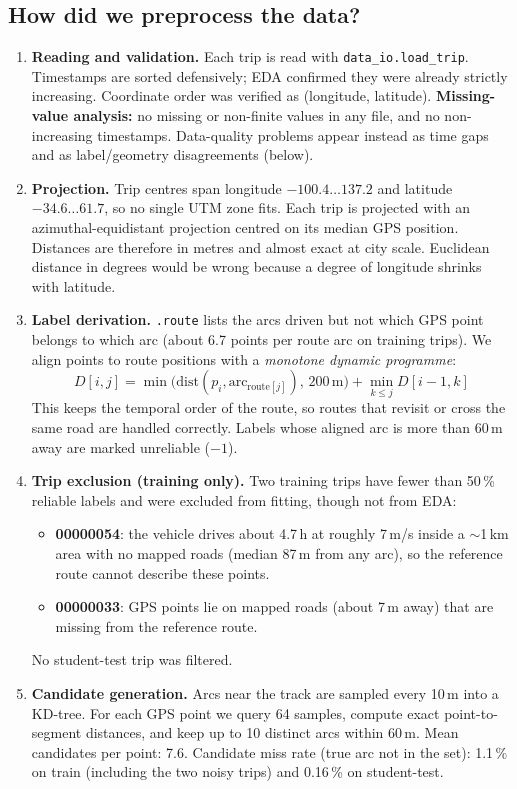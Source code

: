 \documentclass[10pt,a4paper]{article}
\newcommand{\code}[1]{\texttt{\small #1}}
\begin{document}
\subsection{How did we preprocess the data?}
\begin{enumerate}
  \item \textbf{Reading and validation.} Each trip is read with \code{data\_io.load\_trip}. Timestamps are sorted defensively; EDA confirmed they were already strictly increasing. Coordinate order was verified as (longitude, latitude). \textbf{Missing-value analysis:} no missing or non-finite values in any file, and no non-increasing timestamps. Data-quality problems appear instead as time gaps and as label/geometry disagreements (below).
  \item \textbf{Projection.} Trip centres span longitude $-100.4\ldots137.2$ and latitude $-34.6\ldots61.7$, so no single UTM zone fits. Each trip is projected with an azimuthal-equidistant projection centred on its median GPS position. Distances are therefore in metres and almost exact at city scale. Euclidean distance in degrees would be wrong because a degree of longitude shrinks with latitude.
  \item \textbf{Label derivation.} \code{.route} lists the arcs driven but not which GPS point belongs to which arc (about 6.7 points per route arc on training trips). We align points to route positions with a \emph{monotone dynamic programme}:
  \begin{equation*}
  D[i,j] = \min\bigl(\mathrm{dist}(p_i, \mathrm{arc}_{\mathrm{route}[j]}),\,200\,\mathrm{m}\bigr) + \min_{k\le j} D[i-1,k]
  \end{equation*}
  This keeps the temporal order of the route, so routes that revisit or cross the same road are handled correctly. Labels whose aligned arc is more than 60\,m away are marked unreliable ($-1$).
  \item \textbf{Trip exclusion (training only).} Two training trips have fewer than 50\,\% reliable labels and were excluded from fitting, though not from EDA:
  \begin{itemize}
    \item \textbf{00000054}: the vehicle drives about 4.7\,h at roughly 7\,m/s inside a $\sim$1\,km area with no mapped roads (median 87\,m from any arc), so the reference route cannot describe these points.
    \item \textbf{00000033}: GPS points lie on mapped roads (about 7\,m away) that are missing from the reference route.
  \end{itemize}
  No student-test trip was filtered.
  \item \textbf{Candidate generation.} Arcs near the track are sampled every 10\,m into a KD-tree. For each GPS point we query 64 samples, compute exact point-to-segment distances, and keep up to 10 distinct arcs within 60\,m. Mean candidates per point: 7.6. Candidate miss rate (true arc not in the set): 1.1\,\% on train (including the two noisy trips) and 0.16\,\% on student-test.
\end{enumerate}
\end{document}

